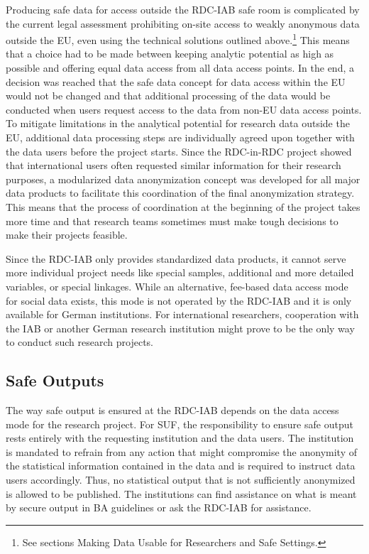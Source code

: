 Producing safe data for access outside the RDC-IAB safe room is complicated by the current legal assessment prohibiting on-site access to weakly anonymous data outside the EU, even using the technical solutions outlined above.\footnote{See sections Making Data Usable for Researchers and Safe Settings.} This means that a choice had to be made between keeping analytic potential as high as possible and offering equal data access from all data access points. In the end, a decision was reached that the safe data concept for data access within the EU would not be changed and that additional processing of the data would be conducted when users request access to the data from non-EU data access points. To mitigate limitations in the analytical potential for research data outside the EU, additional data processing steps are individually agreed upon together with the data users before the project starts. Since the RDC-in-RDC project showed that international users often requested similar information for their research purposes, a modularized data anonymization concept was developed for all major data products to facilitate this coordination of the final anonymization strategy. This means that the process of coordination at the beginning of the project takes more time and that research teams sometimes must make tough decisions to make their projects feasible.

Since the RDC-IAB only provides standardized data products, it cannot serve more individual project needs like special samples, additional and more detailed variables, or special linkages. While an alternative, fee-based data access mode for social data exists, this mode is not operated by the RDC-IAB and it is only available for German institutions. For international researchers, cooperation with the IAB or another German research institution might prove to be the only way to conduct such research projects.

\hypertarget{safe-outputs}{%
\subsection{Safe Outputs}\label{safe-outputs}}

The way safe output is ensured at the RDC-IAB depends on the data access mode for the research project. For SUF, the responsibility to ensure safe output rests entirely with the requesting institution and the data users. The institution is mandated to refrain from any action that might compromise the anonymity of the statistical information contained in the data and is required to instruct data users accordingly. Thus, no statistical output that is not sufficiently anonymized is allowed to be published. The institutions can find assistance on what is meant by secure output in BA guidelines \citep{statistikderbundesagenturfurarbeit2018} or ask the RDC-IAB for assistance.

